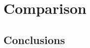 \documentclass[11pt,a4paper,twoside,openright]{book}
\begin{document}
\chapter{Comparison}
\section{Conclusions}
\label{ch:Comparison}

\end{document}
